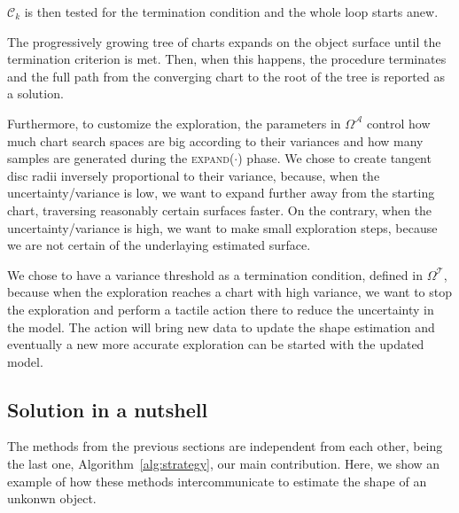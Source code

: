 $\mathcal{C}_k$ is then tested for the termination condition and the whole loop
starts anew.

The progressively growing tree of charts expands on the object surface until
the termination criterion is met. Then, when this happens, the procedure terminates and the full
path from the converging chart to the root of the tree is reported as a solution.

Furthermore, to customize the exploration, the parameters in $\Omega^{\mathcal{A}}$ 
control how much chart search spaces are big according to their variances and how many
samples are generated during the \textsc{expand}($\cdot$) phase. 
We chose to create tangent disc radii inversely proportional to their variance,
because, when the uncertainty/variance is low, we want to expand further
away from the starting chart, traversing reasonably certain surfaces faster.
On the contrary, when the uncertainty/variance is high, we want to make small
exploration steps, because we are not certain of the underlaying estimated surface.

We chose to have a variance threshold as a termination condition, defined in $\Omega^{\mathcal{T}}$,
because when the exploration reaches a chart with high variance, we want to stop
the exploration and perform a tactile action there to reduce the uncertainty in the
model. 
The action will bring new data to update the shape estimation and eventually 
a new more accurate exploration can be started with the updated model.

\subsection{Solution in a nutshell}
\label{sec:summary}

The methods from the previous sections are independent from each other, being the last one, Algorithm~\ref{alg:strategy}, our main contribution. Here, we show an example of how these methods intercommunicate to estimate the shape of an unkonwn object.

